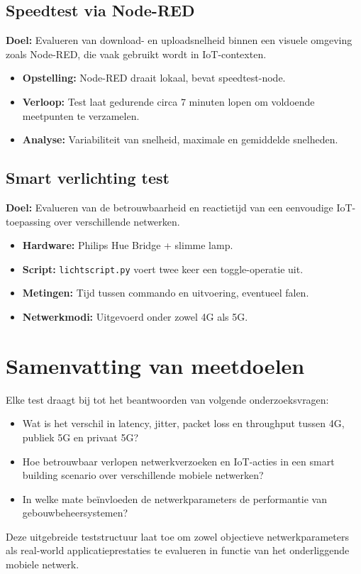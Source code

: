\subsection{Speedtest via Node-RED}
\textbf{Doel:} Evalueren van download- en uploadsnelheid binnen een visuele omgeving zoals Node-RED, die vaak gebruikt wordt in IoT-contexten.

\begin{itemize}
    \item \textbf{Opstelling:} Node-RED draait lokaal, bevat speedtest-node.
    \item \textbf{Verloop:} Test laat gedurende circa 7 minuten lopen om voldoende meetpunten te verzamelen.
    \item \textbf{Analyse:} Variabiliteit van snelheid, maximale en gemiddelde snelheden.
\end{itemize}

\subsection{Smart verlichting test}
\textbf{Doel:} Evalueren van de betrouwbaarheid en reactietijd van een eenvoudige IoT-toepassing over verschillende netwerken.

\begin{itemize}
    \item \textbf{Hardware:} Philips Hue Bridge + slimme lamp.
    \item \textbf{Script:} \texttt{lichtscript.py} voert twee keer een toggle-operatie uit.
    \item \textbf{Metingen:} Tijd tussen commando en uitvoering, eventueel falen.
    \item \textbf{Netwerkmodi:} Uitgevoerd onder zowel 4G als 5G.
\end{itemize}

\section{Samenvatting van meetdoelen}

Elke test draagt bij tot het beantwoorden van volgende onderzoeksvragen:

\begin{itemize}
    \item Wat is het verschil in latency, jitter, packet loss en throughput tussen 4G, publiek 5G en privaat 5G?
    \item Hoe betrouwbaar verlopen netwerkverzoeken en IoT-acties in een smart building scenario over verschillende mobiele netwerken?
    \item In welke mate beïnvloeden de netwerkparameters de performantie van gebouwbeheersystemen?
\end{itemize}

Deze uitgebreide teststructuur laat toe om zowel objectieve netwerkparameters als real-world applicatieprestaties te evalueren in functie van het onderliggende mobiele netwerk.
